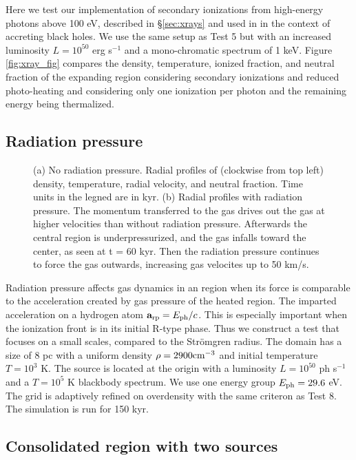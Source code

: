 \documentclass[12pt,preprint]{aastex}
\begin{document}
Here we test our implementation of secondary ionizations from
high-energy photons above 100 eV, described in \S\ref{sec:xrays} and
used in \citet{Alvarez09} in the context of accreting black holes.  We
use the same setup as Test 5 but with an increased luminosity $L =
10^{50}$ erg s$^{-1}$ and a mono-chromatic spectrum of 1 keV.  Figure
\ref{fig:xray_fig} compares the density, temperature, ionized
fraction, and neutral fraction of the expanding  region
considering secondary ionizations and reduced photo-heating and
considering only one ionization per photon and the remaining energy
being thermalized.

\subsection{Radiation pressure}

\begin{figure}[t]
  \caption{\label{fig:rp_profile150} (a) No radiation pressure.
    Radial profiles of (clockwise from top left) density, temperature,
    radial velocity, and neutral fraction.  Time units in the legned
    are in kyr.  (b) Radial profiles with radiation pressure.  The
    momentum transferred to the gas drives out the gas at higher
    velocities than without radiation pressure.  Afterwards the
    central region is underpressurized, and the gas infalls toward the
    center, as seen at t = 60 kyr.  Then the radiation pressure
    continues to force the gas outwards, increasing gas velocites up
    to 50 km/s.}
\end{figure}

Radiation pressure affects gas dynamics in an  region when
its force is comparable to the acceleration created by gas pressure of
the heated region.  The imparted acceleration on a hydrogen atom
$\mathbf{a}_{\rm rp} = E_{\rm ph}/c$.  This is especially important
when the ionization front is in its initial R-type phase.  Thus we
construct a test that focuses on a small scales, compared to the
Str\"{o}mgren radius.  The domain has a size of 8 pc with a uniform
density $\rho = 2900 \cubecm$ and initial temperature $T = 10^3$ K.
The source is located at the origin with a luminosity $L = 10^{50}$ ph
s$^{-1}$ and a $T=10^5$ K blackbody spectrum.  We use one energy group
$E_{\rm ph} = 29.6$ eV.  The grid is adaptively refined on overdensity
with the same criteron as Test 8.  The simulation is run for 150 kyr.

\subsection{Consolidated  region with two sources}
\end{document}
